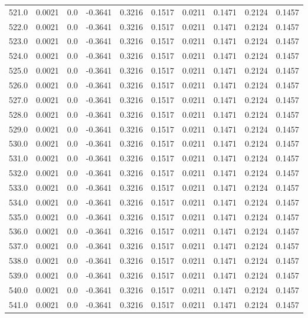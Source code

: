 \begin{longtable}{lrrrrrrrrr}
521.0 & 0.0021 & 0.0 & -0.3641 & 0.3216 & 0.1517 & 0.0211 & 0.1471 & 0.2124 & 0.1457 \\
522.0 & 0.0021 & 0.0 & -0.3641 & 0.3216 & 0.1517 & 0.0211 & 0.1471 & 0.2124 & 0.1457 \\
523.0 & 0.0021 & 0.0 & -0.3641 & 0.3216 & 0.1517 & 0.0211 & 0.1471 & 0.2124 & 0.1457 \\
524.0 & 0.0021 & 0.0 & -0.3641 & 0.3216 & 0.1517 & 0.0211 & 0.1471 & 0.2124 & 0.1457 \\
525.0 & 0.0021 & 0.0 & -0.3641 & 0.3216 & 0.1517 & 0.0211 & 0.1471 & 0.2124 & 0.1457 \\
526.0 & 0.0021 & 0.0 & -0.3641 & 0.3216 & 0.1517 & 0.0211 & 0.1471 & 0.2124 & 0.1457 \\
527.0 & 0.0021 & 0.0 & -0.3641 & 0.3216 & 0.1517 & 0.0211 & 0.1471 & 0.2124 & 0.1457 \\
528.0 & 0.0021 & 0.0 & -0.3641 & 0.3216 & 0.1517 & 0.0211 & 0.1471 & 0.2124 & 0.1457 \\
529.0 & 0.0021 & 0.0 & -0.3641 & 0.3216 & 0.1517 & 0.0211 & 0.1471 & 0.2124 & 0.1457 \\
530.0 & 0.0021 & 0.0 & -0.3641 & 0.3216 & 0.1517 & 0.0211 & 0.1471 & 0.2124 & 0.1457 \\
531.0 & 0.0021 & 0.0 & -0.3641 & 0.3216 & 0.1517 & 0.0211 & 0.1471 & 0.2124 & 0.1457 \\
532.0 & 0.0021 & 0.0 & -0.3641 & 0.3216 & 0.1517 & 0.0211 & 0.1471 & 0.2124 & 0.1457 \\
533.0 & 0.0021 & 0.0 & -0.3641 & 0.3216 & 0.1517 & 0.0211 & 0.1471 & 0.2124 & 0.1457 \\
534.0 & 0.0021 & 0.0 & -0.3641 & 0.3216 & 0.1517 & 0.0211 & 0.1471 & 0.2124 & 0.1457 \\
535.0 & 0.0021 & 0.0 & -0.3641 & 0.3216 & 0.1517 & 0.0211 & 0.1471 & 0.2124 & 0.1457 \\
536.0 & 0.0021 & 0.0 & -0.3641 & 0.3216 & 0.1517 & 0.0211 & 0.1471 & 0.2124 & 0.1457 \\
537.0 & 0.0021 & 0.0 & -0.3641 & 0.3216 & 0.1517 & 0.0211 & 0.1471 & 0.2124 & 0.1457 \\
538.0 & 0.0021 & 0.0 & -0.3641 & 0.3216 & 0.1517 & 0.0211 & 0.1471 & 0.2124 & 0.1457 \\
539.0 & 0.0021 & 0.0 & -0.3641 & 0.3216 & 0.1517 & 0.0211 & 0.1471 & 0.2124 & 0.1457 \\
540.0 & 0.0021 & 0.0 & -0.3641 & 0.3216 & 0.1517 & 0.0211 & 0.1471 & 0.2124 & 0.1457 \\
541.0 & 0.0021 & 0.0 & -0.3641 & 0.3216 & 0.1517 & 0.0211 & 0.1471 & 0.2124 & 0.1457 \\

\end{longtable}
